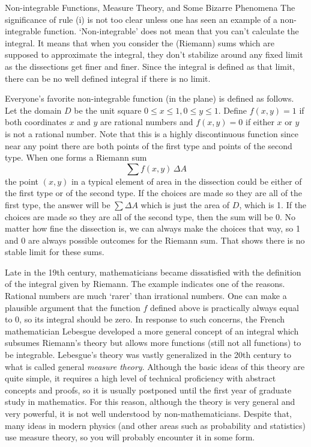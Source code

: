 \subhead Non-integrable Functions, Measure Theory, and
Some Bizarre Phenomena \endsubhead
The significance of rule (i) is not too clear unless one has seen
an example of a non-integrable function.  `Non-integrable'
 does not mean
that you can't calculate the integral.   It means that when you
consider the (Riemann)
sums which are supposed to approximate the integral, they
don't stabilize around any fixed limit as the dissections get
finer and finer.  Since the integral is defined as that limit,
there can be no well defined integral if there is no limit.

Everyone's favorite non-integrable function (in the plane) is
defined as follows.   Let the domain $D$ be the unit square
$0\le x \le 1, 0\le y\le 1$.  Define  $f(x,y) = 1$ if both
coordinates $x$ and $y$ are rational numbers and $f(x,y) = 0$
if either $x$ or $y$ is not a rational number.  Note that
this is a highly discontinuous function since near any point
there are both points of the first type and points of the
second type.
When one forms a Riemann sum
$$
  \sum f(x,y) \, \Delta A
$$
the point $(x,y)$ in a typical element of area in the dissection
could be either of the first type or of the second type.
If the choices are made so they are all of the first type,
the answer will be $\sum \Delta A$ which is just the area of
$D$, which is 1.   If the choices are made so they are all of
the second type, then the sum will be 0.    No matter how
fine the dissection is, we can always make the choices that
way, so 1 and 0 are always possible outcomes for the Riemann
sum.  That shows there is no stable limit for these sums.

Late in the 19th century, mathematicians became dissatisfied
with the definition of the integral given by Riemann.  
The example indicates one of the reasons.  Rational numbers
are much `rarer' than irrational numbers.
One can make a plausible argument that the function $f$
defined above is practically always equal to 0, so its
integral should be zero.   In response to such concerns,
the  French mathematician Lebesgue developed a more general
%
concept of an integral which subsumes Riemann's theory but
allows more functions (still not all functions) to be integrable.
Lebesgue's theory was vastly generalized in the 20th century
to what is  called general {\it measure theory}.
Although the basic ideas of this theory are quite simple, it
requires a high level of technical proficiency  with abstract
concepts and proofs, 
so it is usually postponed
until the first year of graduate study in mathematics.  For
this reason, although the theory is very general and very powerful,
it is not well understood by non-mathematicians.   Despite that,
 many ideas in modern physics (and  other areas such
as probability and statistics) use measure theory,
so you will probably encounter it in some form.

